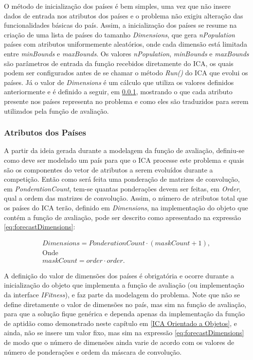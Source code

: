 O método de inicialização dos países é bem simples, uma vez que não insere dados de entrada nos atributos dos países e o problema não exigiu alteração das funcionalidades básicas do país. Assim, a inicialização dos países se resume na criação de uma lista de países do tamanho \emph{Dimensions}, que gera \emph{nPopulation} países com atributos uniformemente aleatórios, onde cada dimensão está limitada entre \emph{minBounds} e \emph{maxBounds}. Os valores \emph{nPopulation}, \emph{minBounds} e \emph{maxBounds} são parâmetros de entrada da função recebidos diretamente do ICA, os quais podem ser configurados antes de se chamar o método \emph{Run()} do ICA que evolui os países. Já o valor de \emph{Dimensions} é um cálculo que utiliza os valores definidos anteriormente e é definido a seguir,  em \ref{Atributos dos Países}, mostrando o que cada atributo presente nos países representa no problema e como eles são traduzidos para serem utilizados pela função de avaliação.





\subsubsection{Atributos dos Países}
\label{Atributos dos Países}

A partir da ideia gerada durante a modelagem da função de avaliação, definiu-se como deve ser modelado um país para que o ICA processe este problema e quais são os componentes do vetor de atributos a serem evoluídos durante a competição. Então como será feita uma ponderação de matrizes de convolução, em \emph{PonderationCount}, tem-se quantas ponderações devem ser feitas, em \emph{Order}, qual a ordem das matrizes de convolução. Assim, o número de atributos total que os países do ICA terão, definido em \emph{Dimensions}, na implementação do objeto que contém a função de avaliação, pode ser descrito como apresentado na expressão \ref{eq:forecastDimensions}: 
	
\begin{equation}
\label{eq:forecastDimensions}
\begin{split}
Dimensions = PonderationCount \cdot (maskCount + 1), 
\\\text{Onde}
\\maskCount = order \cdot order.
\end{split}
\end{equation}

A definição do valor de dimensões dos países é obrigatória e ocorre durante a inicialização do objeto que implementa a função de  avaliação (ou implementação da interface \emph{IFitness}), e faz parte da modelagem do problema. Note que não se define diretamente o valor de dimensões no país, mas sim na função de avaliação, para  que a solução fique genérica e dependa apenas da implementação da função de aptidão como demonstrado neste capítulo em \ref{ICA Orientado a Objetos}, e ainda, não se insere um valor fixo, mas sim na expressão \ref{eq:forecastDimensions} de modo que o número de dimensões ainda varie de acordo com os valores de número de ponderações e ordem da máscara de convolução.

